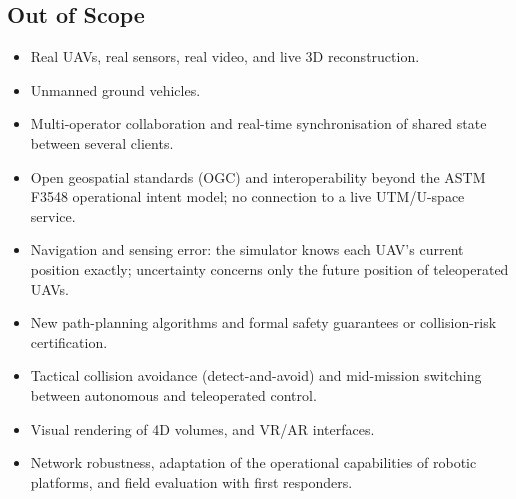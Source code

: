 \documentclass{article}
\begin{document}
\subsection{Out of Scope}
\begin{itemize}
  \item Real UAVs, real sensors, real video, and live 3D reconstruction.
  \item Unmanned ground vehicles.
  \item Multi-operator collaboration and real-time synchronisation of shared state between several clients.
  \item Open geospatial standards (OGC) and interoperability beyond the ASTM F3548 operational intent model; no connection to a live UTM/U-space service.
  \item Navigation and sensing error: the simulator knows each UAV's current position exactly; uncertainty concerns only the future position of teleoperated UAVs.
  \item New path-planning algorithms and formal safety guarantees or collision-risk certification.
  \item Tactical collision avoidance (detect-and-avoid) and mid-mission switching between autonomous and teleoperated control.
  \item Visual rendering of 4D volumes, and VR/AR interfaces.
  \item Network robustness, adaptation of the operational capabilities of robotic platforms, and field evaluation with first responders.
\end{itemize}

\newpage


\end{document}
